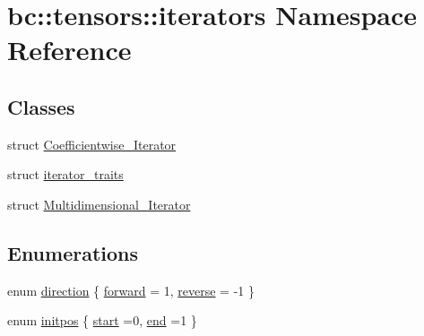 \hypertarget{namespacebc_1_1tensors_1_1iterators}{}\section{bc\+:\+:tensors\+:\+:iterators Namespace Reference}
\label{namespacebc_1_1tensors_1_1iterators}
\subsection*{Classes}
\begin{DoxyCompactItemize}
\item 
struct \hyperlink{structbc_1_1tensors_1_1iterators_1_1Coefficientwise__Iterator}{Coefficientwise\+\_\+\+Iterator}
\item 
struct \hyperlink{structbc_1_1tensors_1_1iterators_1_1iterator__traits}{iterator\+\_\+traits}
\item 
struct \hyperlink{structbc_1_1tensors_1_1iterators_1_1Multidimensional__Iterator}{Multidimensional\+\_\+\+Iterator}
\end{DoxyCompactItemize}
\subsection*{Enumerations}
\begin{DoxyCompactItemize}
\item 
enum \hyperlink{namespacebc_1_1tensors_1_1iterators_ae76efe63fb9cb4985d5e4e6af0ebf296}{direction} \{ \hyperlink{namespacebc_1_1tensors_1_1iterators_ae76efe63fb9cb4985d5e4e6af0ebf296a4c6d44dd04b548a4e8e0a6f7a2f2ecca}{forward} = 1, 
\hyperlink{namespacebc_1_1tensors_1_1iterators_ae76efe63fb9cb4985d5e4e6af0ebf296ab27391fd31026cbed964d12f30ba6a41}{reverse} = -\/1
 \}
\item 
enum \hyperlink{namespacebc_1_1tensors_1_1iterators_ac0f260c401cebb2593c531198018876e}{initpos} \{ \hyperlink{namespacebc_1_1tensors_1_1iterators_ac0f260c401cebb2593c531198018876ea81ae03c111f0b56026c966788c4c278e}{start} =0, 
\hyperlink{namespacebc_1_1tensors_1_1iterators_ac0f260c401cebb2593c531198018876eab558a540d38cc75942ed86578e792027}{end} =1
 \}
\end{DoxyCompactItemize}
